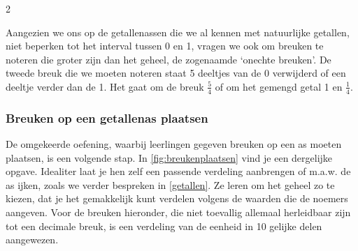 \begin{multicols}{2}


Aangezien we ons op de getallenassen die we al kennen met natuurlijke getallen, niet beperken tot het interval tussen 0 en 1, vragen we ook om breuken te noteren die groter zijn dan het geheel, de zogenaamde `onechte breuken'.
De tweede breuk die we moeten noteren staat 5 deeltjes van de 0 verwijderd of een deeltje verder dan de 1.
Het gaat om de breuk \(\frac{5}{4}\) of om het gemengd getal 1 en \(\frac{1}{4}\).

\subsubsection*{Breuken op een getallenas plaatsen}
De omgekeerde oefening, waarbij leerlingen gegeven breuken op een as moeten plaatsen, is een volgende stap. In \autoref{fig:breukenplaatsen} vind je een dergelijke opgave.
Idealiter laat je hen zelf een passende verdeling aanbrengen of m.a.w. de as ijken, zoals we verder bespreken in \autoref{getallen}.
Ze leren om het geheel zo te kiezen, dat je het gemakkelijk kunt verdelen volgens de waarden die de noemers aangeven.
Voor de breuken hieronder, die niet toevallig allemaal herleidbaar zijn tot een decimale breuk, is een verdeling van de eenheid in 10 gelijke delen aangewezen.

\end{multicols}
